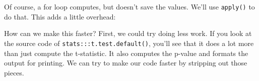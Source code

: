Of course, a for loop computes, but doesn't save the values. We'll use
\texttt{apply()} to do that. This adds a little overhead:

\begin{Shaded}
\begin{Highlighting}[]
\StringTok{ }
  \NormalTok{(x[grp ==}\StringTok{ }\NormalTok{], x[grp ==}\StringTok{ }\NormalTok{])$stat}
\NormalTok{\}}
\StringTok{ } 
\end{Highlighting}
\end{Shaded}

How can we make this faster? First, we could try doing less work. If you
look at the source code of \texttt{stats:::t.test.default()}, you'll see
that it does a lot more than just compute the t-statistic. It also
computes the p-value and formats the output for printing. We can try to
make our code faster by stripping out those pieces.

\begin{Shaded}
\begin{Highlighting}[]
\StringTok{ }
  \StringTok{ }
    \StringTok{ }
    \StringTok{ }
    \StringTok{ }\StringTok{ }\StringTok{ }\NormalTok{) /}\StringTok{ }\StringTok{ }\NormalTok{)}

    \NormalTok{(}   
  \NormalTok{\}}

  \StringTok{ }\NormalTok{(x[grp ==}\StringTok{ }\NormalTok{])}
  \StringTok{ }\NormalTok{(x[grp ==}\StringTok{ }\NormalTok{])}

  \StringTok{ }\StringTok{ }\StringTok{ }\StringTok{ }
  \StringTok{ }\StringTok{ }
\NormalTok{\}}
\StringTok{ } 
\NormalTok{(}
\end{Highlighting}
\end{Shaded}

